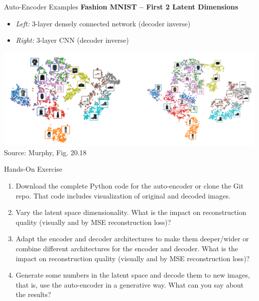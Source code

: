 \documentclass[ignorenonframetext,xcolor=x11names]{beamer}
\begin{document}
\begin{frame}{Auto-Encoder Examples}
\textbf{Fashion MNIST -- First 2 Latent Dimensions}
\begin{itemize}
   \item \emph{Left:} 3-layer densely connected network (decoder inverse)
   \item \emph{Right:} 3-layer CNN (decoder inverse)
\end{itemize} 

\begin{center}
\includegraphics[width=\textwidth]{murphy_20_18.png} \\

\scriptsize Source: Murphy, Fig. 20.18 \normalsize
\end{center}
\end{frame}

\begin{frame}{Hands-On Exercise}
\begin{enumerate}
  \item Download the complete Python code for the auto-encoder or clone the Git repo. That code includes visualization of original and decoded images.
  \item Vary the latent space dimensionality. What is the impact on reconstruction quality (visually and by MSE reconstruction loss)?
  \item Adapt the encoder and decoder architectures to make them deeper/wider or combine different architectures for the encoder and decoder. What is the impact on reconstruction quality (visually and by MSE reconstruction loss)?
  \item Generate some numbers in the latent space and decode them to new images, that is, use the auto-encoder in a generative way. What can you say about the results?
\end{enumerate}
\end{frame}
\end{document}
